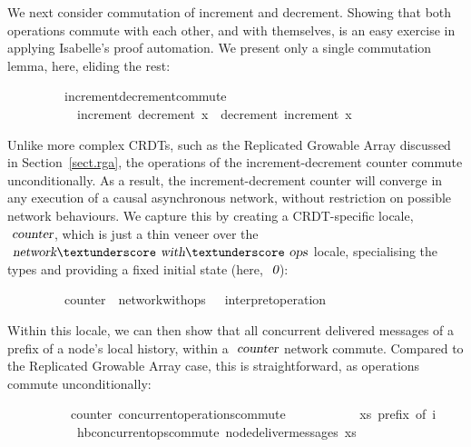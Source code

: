 We next consider commutation of increment and decrement.
Showing that both operations commute with each other, and with themselves, is an easy exercise in applying Isabelle's proof automation.
We present only a single commutation lemma, here, eliding the rest:
\vspace{0.35em}
\begin{isabellebody}
\ \ \ \ \ \ \ \ \ increment{\isacharunderscore}decrement{\isacharunderscore}commute{\isacharcolon}\isanewline
\ \ \ \ \ \ \ \ \ \ \ {\isachardoublequoteopen}increment\ {\isacharparenleft}decrement\ x{\isacharparenright}\ {\isacharequal}\ decrement\ {\isacharparenleft}increment\ x{\isacharparenright}{\isachardoublequoteclose}
\end{isabellebody}
\vspace{0.35em}
Unlike more complex CRDTs, such as the Replicated Growable Array discussed in Section~\ref{sect.rga}, the operations of the increment-decrement counter commute unconditionally.
As a result, the increment-decrement counter will converge in any execution of a causal asynchronous network, without restriction on possible network behaviours.
We capture this by creating a CRDT-specific locale, $\isa{counter}$, which is just a thin veneer over the $\isa{network}{\isacharunderscore}\isa{with}{\isacharunderscore}\isa{ops}$ locale, specialising the types and providing a fixed initial state (here, $\isa{0}$):
\vspace{0.35em}
\begin{isabellebody}
\ \ \ \ \ \ \ \ \ counter\ {\isacharequal}\ network{\isacharunderscore}with{\isacharunderscore}ops\ {\isacharunderscore}\ {\isacharunderscore}\ interpret{\isacharunderscore}operation\ {}
\end{isabellebody}
\vspace{0.35em}
Within this locale, we can then show that all concurrent delivered messages of a prefix of a node's local history, within a $\isa{counter}$ network commute.
Compared to the Replicated Growable Array case, this is straightforward, as operations commute unconditionally:
\vspace{0.35em}
\begin{isabellebody}
\ \ \ \ \ \ \ \ \ {\isacharparenleft}\ counter{\isacharparenright}\ concurrent{\isacharunderscore}operations{\isacharunderscore}commute{\isacharcolon}\isanewline
\ \ \ \ \ \ \ \ \ \ \ {\isachardoublequoteopen}xs\ prefix\ of\ i{\isachardoublequoteclose}\isanewline
\ \ \ \ \ \ \ \ \ \ \ {\isachardoublequoteopen}hb{\isachardot}concurrent{\isacharunderscore}ops{\isacharunderscore}commute\ {\isacharparenleft}node{\isacharunderscore}deliver{\isacharunderscore}messages\ xs{\isacharparenright}{\isachardoublequoteclose}
\end{isabellebody}
